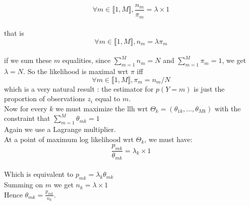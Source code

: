 \documentclass[11pt,a4paper]{article}
\begin{document}
 $$\forall m \in \llbracket 1, M \rrbracket, \frac{n_m}{\pi_m} = \lambda \times 1$$
\\that is 
$$\forall m \in \llbracket 1, M \rrbracket, n_m = \lambda \pi_m$$
\\if we sum these $m$ equalities, since $\sum\limits_{m=1}^{M} n_m = N$ and $\sum\limits_{m=1}^{M} \pi_m = 1$, we get $\lambda = N$.
So the likelihood is maximal wrt $\pi$ iff $$\forall m \in \llbracket 1, M \rrbracket,  \pi_m = n_m/N$$
which is a very natural result : the estimator for $p(Y=m)$ is just the proportion of observations $z_i$ equal to $m$.
%
\\[5mm]Now for every $k$ we must maximize the llh wrt $\Theta_k = (\theta_{1k}, \ldots, \theta_{Mk})$ with the constraint that $ \sum\limits_{m=1}^{M}  \theta_{mk} = 1$
\\Again we use a Lagrange multiplier.
\\At a point of maximum log likelihood wrt $\Theta_k$, we must have:
%
$$\frac{p_{mk}}{ \theta_{mk}} = \lambda_k \times 1$$
\\Which is equivalent to $p_{mk} = \lambda_k \theta_{mk}$
\\Summing on $m$ we get $n_k = \lambda \times 1$
\\Hence $\theta_{mk} = \frac{p_{mk}}{n_k}$.
\end{document}
